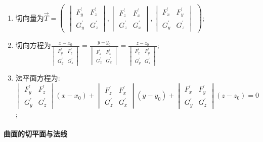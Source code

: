 \documentclass[
]{article}
\begin{document}
\begin{enumerate}
\def\labelenumi{\arabic{enumi}.}
\item
  切向量为\(\vec{T} = \begin{pmatrix} \begin{vmatrix} F^{'}_y & F^{'}_z \\ G^{'}_y & G^{'}_z \end{vmatrix},\begin{vmatrix} F^{'}_z & F^{'}_x \\ G^{'}_z & G^{'}_x\end{vmatrix},\begin{vmatrix} F^{'}_x & F^{'}_y \\ G^{'}_y & G^{'}_z \end{vmatrix} \end{pmatrix}\);
\item
  切向方程为\( \frac{x-x_0}{\begin{vmatrix} F^{'}_y & F^{'}_z \\ G^{'}_y & G^{'}_z \end{vmatrix}}=\frac{y-y_0}{\begin{vmatrix} F^{'}_z & F^{'}_x \\ G^{'}_z & G^{'}_x\end{vmatrix}}=\frac{z-z_0}{\begin{vmatrix} F^{'}_x & F^{'}_y \\ G^{'}_y & G^{'}_z \end{vmatrix}}\);
\item
  法平面方程为:\( \begin{vmatrix} F^{'}_y & F^{'}_z \\ G^{'}_y & G^{'}_z \end{vmatrix}(x-x_0)+\begin{vmatrix} F^{'}_z & F^{'}_x \\ G^{'}_z & G^{'}_x\end{vmatrix}(y-y_0)+\begin{vmatrix} F^{'}_x & F^{'}_y \\ G^{'}_y & G^{'}_z \end{vmatrix}(z-z_0)=0\);
\end{enumerate}

\hypertarget{ux66f2ux9762ux7684ux5207ux5e73ux9762ux4e0eux6cd5ux7ebf}{%
\paragraph{曲面的切平面与法线}\label{ux66f2ux9762ux7684ux5207ux5e73ux9762ux4e0eux6cd5ux7ebf}}
\end{document}

